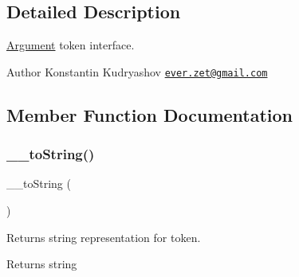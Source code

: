 \subsection{Detailed Description}
\mbox{\hyperlink{class_prophecy_1_1_argument}{Argument}} token interface.

\begin{DoxyAuthor}{Author}
Konstantin Kudryashov \href{mailto:ever.zet@gmail.com}{\tt ever.\+zet@gmail.\+com} 
\end{DoxyAuthor}


\subsection{Member Function Documentation}
\mbox{\label{interface_prophecy_1_1_argument_1_1_token_1_1_token_interface_a7516ca30af0db3cdbf9a7739b48ce91d}} 
\subsubsection{\texorpdfstring{\+\_\+\+\_\+to\+String()}{\_\_toString()}}
{\footnotesize\ttfamily \+\_\+\+\_\+to\+String (\begin{DoxyParamCaption}{ }\end{DoxyParamCaption})}

Returns string representation for token.

\begin{DoxyReturn}{Returns}
string 
\end{DoxyReturn}


